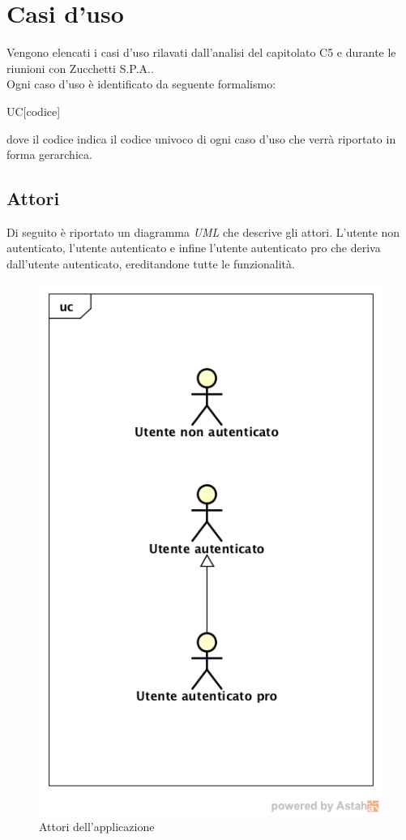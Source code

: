 \section{Casi d'uso}
Vengono elencati i casi d'uso rilavati dall'analisi del capitolato C5 e durante le riunioni con Zucchetti S.P.A.. \\
Ogni caso d'uso è identificato da seguente formalismo:
\begin{center}
	UC[codice]
\end{center}
dove il codice indica il codice univoco di ogni caso d'uso che verrà riportato in forma gerarchica.

\subsection{Attori}
Di seguito è riportato un diagramma \textit{UML} che descrive gli attori. L'utente non autenticato, l'utente autenticato e infine l'utente autenticato pro che deriva dall'utente autenticato, ereditandone tutte le funzionalità.
\label{Attori}
\begin{figure}
	\centering
	\includegraphics[scale=0.45]{UML/attori.png}
	\caption{Attori dell'applicazione}
\end{figure}


